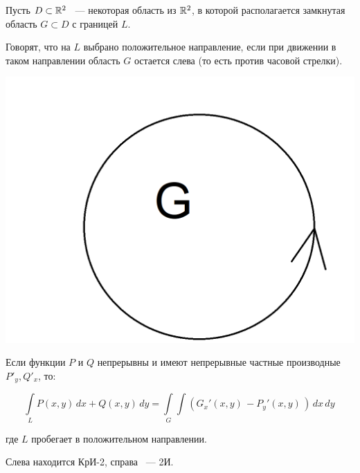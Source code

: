 \documentclass[../../main.tex]{subfiles}
\begin{document}
Пусть $D \subset \mathbb{R}^2$ ~--- некоторая область из $\mathbb{R}^2$, в которой
располагается замкнутая область $G \subset D$ с границей $L$.

Говорят, что на $L$ выбрано положительное направление,
если при движении в таком направлении область $G$ остается слева
(то есть против часовой стрелки).

\begin{center}
	\includegraphics[scale = 0.4]{lec20_2.png}
\end{center}

\begin{thm}
	Если функции $P$ и $Q$ непрерывны и имеют непрерывные частные производные 
	$P'_y, Q'_x$, то:
	
	\begin{equation}
	\label{lec_20, num_2}
	\int\limits_{L} P \left( x, y \right)\, dx + Q \left( x, y \right)\,
	dy = \int\limits_{G}\int \left( G_x' \left(x, y \right)\,
	- P_y' \left(x, y \right)\, \right)\, dx\, dy\,
	\end{equation}
	
	где $L$ пробегает в положительном направлении.
	
	Слева находится КрИ-2, справа ~--- 2И.
\end{thm}
\end{document}
